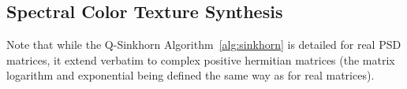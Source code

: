 

\subsection{Spectral Color Texture Synthesis}


Note that while the Q-Sinkhorn Algorithm~\ref{alg:sinkhorn} is detailed for real PSD matrices, it extend verbatim to complex positive hermitian matrices (the matrix logarithm and exponential being defined the same way as for real matrices).